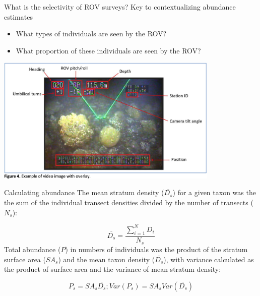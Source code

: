 \documentclass[
  ignorenonframetext,
]{beamer}
\providecommand{\tightlist}{%
  \setlength{\itemsep}{0pt}\setlength{\parskip}{0pt}}
\begin{document}
\begin{frame}{What is the selectivity of ROV surveys? \textbar{} Key to
contextualizing abundance estimates}
\protect\hypertarget{what-is-the-selectivity-of-rov-surveys-key-to-contextualizing-abundance-estimates}{}
\begin{itemize}
\tightlist
\item
  What types of individuals are seen by the ROV?
\item
  What proportion of these individuals are seen by the ROV?
\end{itemize}

\includegraphics[width=0.8\textwidth,height=\textheight]{ROV_example_video.png}
\end{frame}

\begin{frame}{Calculating abundance}
\protect\hypertarget{calculating-abundance}{}
The mean stratum density (\(\overline{D_s}\)) for a given taxon was the
the sum of the individual transect densities divided by the number of
transects (\(N_s\)):

\[
\overline{D_s} = \frac{\sum\limits_{i=1}^N D_i} {N_s}
\] Total abundance (\(P\)) in numbers of individuals was the product of
the stratum surface area (\(SA_s\)) and the mean taxon density
(\(\overline{D_s}\)), with variance calculated as the product of surface
area and the variance of mean stratum density:

\[
P_s = SA_s\overline{D_s};Var(P_s) = SA_sVar(\overline{D_s})
\]
\end{frame}
\end{document}
